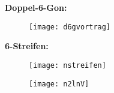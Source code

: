 \documentclass{beamer}
\begin{document}
\begin{frame}
\textbf{Doppel-6-Gon:}
\begin{figure}[H]
\begin{center}
\texttt{[image: d6gvortrag]}
\end{center}
\end{figure}
\end{frame}
\begin{frame}
\textbf{6-Streifen:}
\begin{figure}[H]
\begin{center}
\texttt{[image: nstreifen]}
\end{center}
\end{figure}
\end{frame}
\begin{frame}
\begin{figure}[H]
\begin{center}
\texttt{[image: n2lnV]}
\end{center}
\end{figure}
\end{frame}
\end{document}
